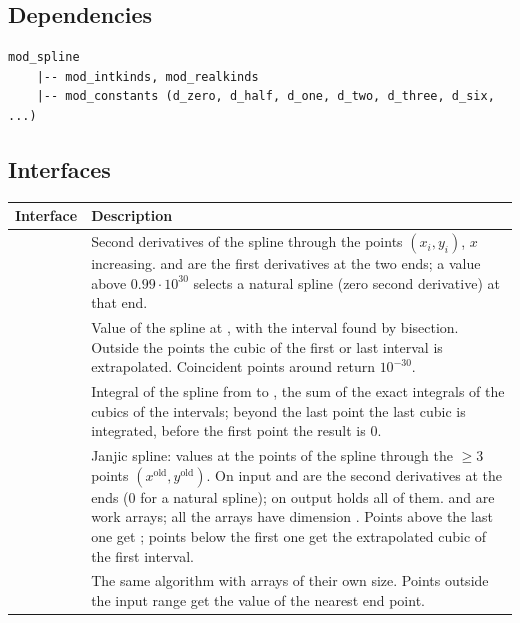 \subsection{Dependencies}

\begin{lstlisting}
mod_spline
    |-- mod_intkinds, mod_realkinds
    |-- mod_constants (d_zero, d_half, d_one, d_two, d_three, d_six, ...)
\end{lstlisting}

\subsection{Interfaces}

\begin{longtable}{L{5.2cm} L{8.8cm}}
  \toprule
  \textbf{Interface} & \textbf{Description} \\
  \midrule
  \endhead
  \bottomrule
  \endfoot
   &
    Second derivatives  of the spline through the points
    $(x_i, y_i)$, $x$ increasing.  and  are the first
    derivatives at the two ends; a value above $0.99\cdot10^{30}$ selects a
    natural spline (zero second derivative) at that end. \\
   &
    Value  of the spline at , with the interval found by
    bisection. Outside the points the cubic of the first or last interval is
    extrapolated. Coincident points around  return $10^{-30}$. \\
   &
    Integral  of the spline from  to , the sum of
    the exact integrals of the cubics of the intervals; beyond the last
    point the last cubic is integrated, before the first point the result
    is 0. \\
   &
    Janjic spline: values  at the  points 
    of the spline through the  $\geq 3$ points
    $(x^\text{old}, y^\text{old})$. On input  and
     are the second derivatives at the ends (0 for a natural
    spline); on output  holds all of them.  and 
    are work arrays; all the arrays have dimension . Points above
    the last one get ; points below the first one get the
    extrapolated cubic of the first interval. \\
   &
    The same algorithm with arrays of their own size. Points outside the
    input range get the value of the nearest end point. \\
\end{longtable}

